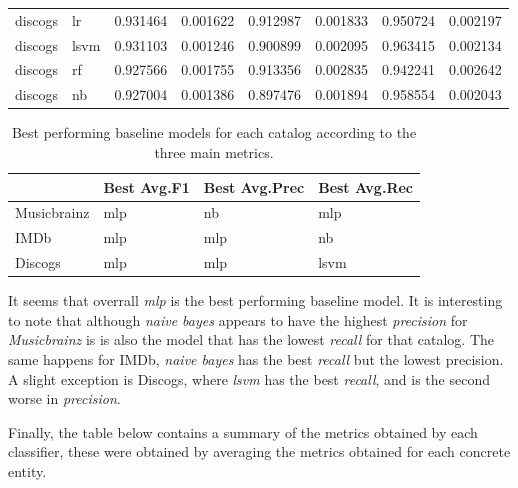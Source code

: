 \documentclass[epsfig,a4paper,11pt,titlepage,twoside,openany]{book}
\begin{document}
\begin{longtable}{|l|l|l|l|l|l|l|l|}
discogs     & lr              & 0.931464   & 0.001622       & 0.912987     & 0.001833         & 0.950724       & 0.002197           \\
discogs     & lsvm & 0.931103   & 0.001246       & 0.900899     & 0.002095         & 0.963415       & 0.002134           \\
discogs     & rf                    & 0.927566   & 0.001755       & 0.913356     & 0.002835         & 0.942241       & 0.002642           \\
discogs     & nb                      & 0.927004   & 0.001386       & 0.897476     & 0.001894         & 0.958554       & 0.002043           \\ \hline
\end{longtable}


\begin{table}[H]
\centering
\begin{tabular}{l|l|l|l}
                                  & Best Avg.F1 & Best Avg.Prec & Best Avg.Rec \\ \hline
\multicolumn{1}{l|}{Musicbrainz} & mlp    & nb       & mlp     \\ \hline
\multicolumn{1}{l|}{IMDb}        & mlp    & mlp      & nb      \\ \hline
\multicolumn{1}{l|}{Discogs}     & mlp    & mlp      & lsvm    \\ 
\end{tabular}
\caption{Best performing baseline models for each catalog according to the three main metrics.}
\label{tab:best-model-per-metric-average}
\end{table}

It seems that overrall \textit{mlp} is the best performing baseline model. It is interesting to note that although \textit{naive bayes} appears to have the highest \textit{precision} for \textit{Musicbrainz} is is also the model that has the lowest \textit{recall} for that catalog. The same happens for IMDb, \textit{naive bayes} has the best \textit{recall} but the lowest precision. A slight exception is Discogs, where \textit{lsvm} has the best \textit{recall}, and is the second worse in \textit{precision}.



Finally, the table below contains a summary of the metrics obtained by each classifier, these were obtained by averaging the metrics obtained for each concrete entity.  
\end{document}
